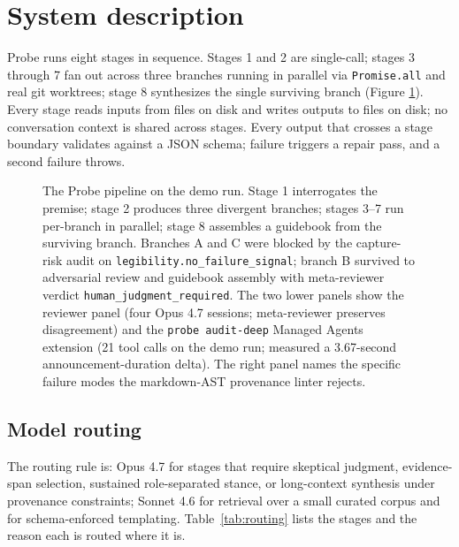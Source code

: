 \section{System description}
\label{sec:system}

Probe runs eight stages in sequence. Stages 1 and 2 are single-call; stages 3 through 7 fan out across three branches running in parallel via \texttt{Promise.all} and real git worktrees; stage 8 synthesizes the single surviving branch (Figure \ref{fig:pipeline}). Every stage reads inputs from files on disk and writes outputs to files on disk; no conversation context is shared across stages. Every output that crosses a stage boundary validates against a JSON schema; failure triggers a repair pass, and a second failure throws.

\begin{figure}[t]
\centering

\caption{The Probe pipeline on the demo run. Stage 1 interrogates the premise; stage 2 produces three divergent branches; stages 3--7 run per-branch in parallel; stage 8 assembles a guidebook from the surviving branch. Branches A and C were blocked by the capture-risk audit on \texttt{legibility.no\_failure\_signal}; branch B survived to adversarial review and guidebook assembly with meta-reviewer verdict \texttt{human\_judgment\_required}. The two lower panels show the reviewer panel (four Opus 4.7 sessions; meta-reviewer preserves disagreement) and the \texttt{probe audit-deep} Managed Agents extension (21 tool calls on the demo run; measured a 3.67-second announcement-duration delta). The right panel names the specific failure modes the markdown-AST provenance linter rejects.}
\label{fig:pipeline}
\end{figure}

\subsection{Model routing}

The routing rule is: Opus 4.7 for stages that require skeptical judgment, evidence-span selection, sustained role-separated stance, or long-context synthesis under provenance constraints; Sonnet 4.6 for retrieval over a small curated corpus and for schema-enforced templating. Table~\ref{tab:routing} lists the stages and the reason each is routed where it is.

